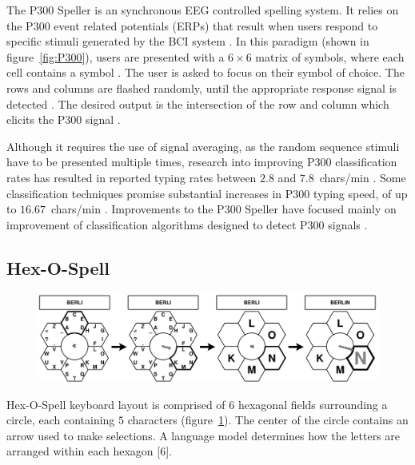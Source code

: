 \documentclass[12pt,titlepage]{article}
\begin{document}
The P300 Speller is an synchronous EEG controlled spelling system.   It relies on the P300 event 
related potentials (ERPs) that result when users respond to specific stimuli generated by the BCI 
system \cite{sellers_p300-based_2006}.  In this paradigm (shown in figure~\ref{fig:P300}), users are presented with a $6\times6$ matrix of symbols, where 
each cell contains a symbol \cite{sellers_p300-based_2006}.  The user is asked to focus on their symbol of choice.  The rows and 
columns are flashed randomly, until the appropriate response signal is detected \cite{sellers_p300-based_2006}.  The desired output
is the intersection of the row and column which elicits the P300 signal \cite{sellers_p300-based_2006}.

Although it requires the use of signal averaging, as the random sequence stimuli have to be presented 
multiple times, research into improving P300 classification rates has resulted in reported typing rates 
between $2.8$ and $7.8$~chars/min \cite{sellers_braincomputer_2004}.  Some classification techniques promise substantial increases in 
P300 typing speed, of up to $16.67$~chars/min \cite{wolpaw_braincomputer_2002}.  Improvements to the P300 Speller have focused mainly on improvement of classification algorithms designed to detect P300 signals \cite{krusienski2006comparison} \cite{wolpaw_braincomputer_2002} \cite{sellers_braincomputer_2004}.

\subsection{Hex-O-Spell}

\begin{figure}[t]
\begin{center}
	\includegraphics[scale=0.10]{figure3.jpeg}
	\label{fig:Hex}
\end{center}
\end{figure}

Hex-O-Spell keyboard layout is comprised of $6$ hexagonal fields surrounding a circle, each containing 
$5$ characters (figure~\ref{fig:Hex}).  The center of the circle contains an arrow used to make selections.  A language 
model determines how the letters are arranged within each hexagon [6].
\end{document}
